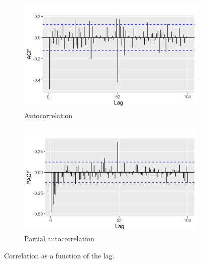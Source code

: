 \documentclass[12pt, letterpaper]{article}\usepackage[]{graphicx}\usepackage[]{color}
\begin{document}
\begin{figure}[h!]
\centering
\begin{subfigure}{0.49\textwidth}
\includegraphics[width = \textwidth]{"figures/ACF.png"}
\caption{Autocorrelation}
\label{fig:ACF}
\end{subfigure}
\hfill
\begin{subfigure}{0.49\textwidth}
\includegraphics[width = \textwidth]{"figures/PACF.png"}
\caption{Partial autocorrelation}
\label{fig:PACF}
\end{subfigure}
\caption{Correlation as a function of the lag.}
\label{fig:correlation}
\end{figure}
\end{document}

